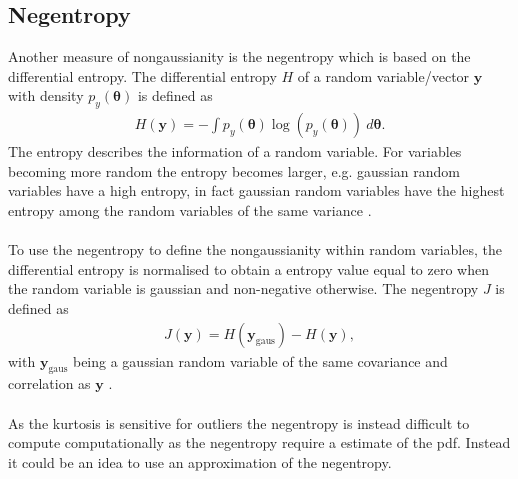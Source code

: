 \subsection{Negentropy}
Another measure of nongaussianity is the negentropy which is based  on the differential entropy. The differential entropy $H$ of a random variable/vector $\mathbf{y}$ with density $p_y (\boldsymbol{\theta})$ is defined as
\begin{align*}
H(\mathbf{y}) = - \int p_y (\boldsymbol{\theta}) \log (p_y (\boldsymbol{\theta})) \ d\boldsymbol{\theta}.
\end{align*}
The entropy describes the information of a random variable. For variables becoming more random the entropy becomes larger, e.g. gaussian random variables have a high entropy, in fact gaussian random variables have the highest entropy among the random variables of the same variance \cite[p. 182]{ICA}.
\\ \\
To use the negentropy to define the nongaussianity within random variables, the differential entropy is normalised to obtain a entropy value equal to zero when the random variable is gaussian and non-negative otherwise. The negentropy $J$ is defined as 
\begin{align*}
J(\mathbf{y}) = H(\mathbf{y}_{\text{gaus}}) - H(\mathbf{y}),
\end{align*}
with $\mathbf{y}_{\text{gaus}}$ being a gaussian random variable of the same covariance and correlation as $\mathbf{y}$ \cite[p. 182]{ICA}.
\\ \\
As the kurtosis is sensitive for outliers the negentropy is instead difficult to compute computationally as the negentropy require a estimate of the pdf. Instead it could be an idea to use an approximation of the negentropy.
 
